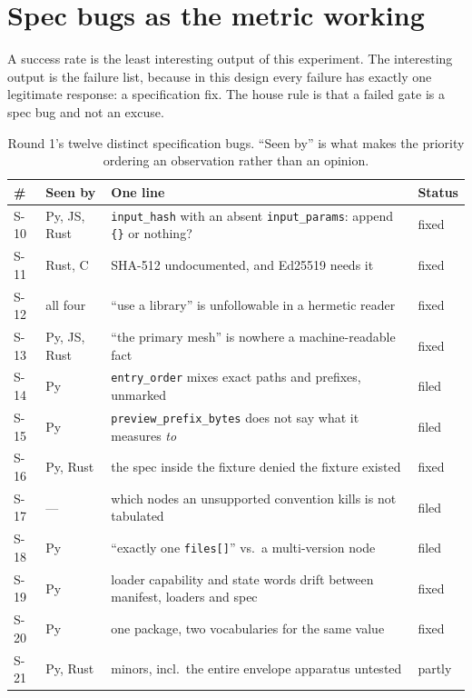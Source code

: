 \documentclass[10pt,twocolumn,letterpaper]{article}
\newcommand{\code}[1]{\texttt{\small #1}}
\begin{document}
\section{Spec bugs as the metric working}
\label{sec:bugs}

A success rate is the least interesting output of this experiment. The
interesting output is the failure list, because in this design every failure has
exactly one legitimate response: a specification fix. The house rule is that a
failed gate is a spec bug and not an excuse.

\begin{table}[t]
\caption{Round 1's twelve distinct specification bugs. ``Seen by'' is what makes
the priority ordering an observation rather than an opinion.}
\label{tab:bugs}
\small
\begin{tabular}{@{}lL{1.5cm}L{3.4cm}l@{}}
\toprule
\# & Seen by & One line & Status \\
\midrule
S-10 & Py, JS, Rust & \code{input\_hash} with an absent \code{input\_params}: append \code{\{\}} or nothing? & fixed \\
S-11 & Rust, C & SHA-512 undocumented, and Ed25519 needs it & fixed \\
S-12 & all four & ``use a library'' is unfollowable in a hermetic reader & fixed \\
S-13 & Py, JS, Rust & ``the primary mesh'' is nowhere a machine-readable fact & fixed \\
S-14 & Py & \code{entry\_order} mixes exact paths and prefixes, unmarked & filed \\
S-15 & Py & \code{preview\_prefix\_bytes} does not say what it measures \emph{to} & filed \\
S-16 & Py, Rust & the spec inside the fixture denied the fixture existed & fixed \\
S-17 & --- & which nodes an unsupported convention kills is not tabulated & filed \\
S-18 & Py & ``exactly one \code{files[]}'' vs.\ a multi-version node & filed \\
S-19 & Py & loader capability and state words drift between manifest, loaders and spec & fixed \\
S-20 & Py & one package, two vocabularies for the same value & fixed \\
S-21 & Py, Rust & minors, incl.\ the entire envelope apparatus untested & partly \\
\bottomrule
\end{tabular}
\end{table}
\end{document}
